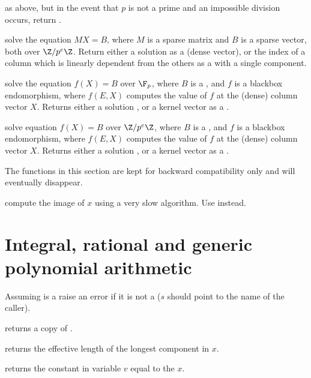as above, but in the event that $p$ is not a prime and an impossible division
occurs, return .

solve the equation $MX = B$, where $M$ is a sparse matrix and $B$ is a sparse
vector, both over $\Z/p^e\Z$. Return either a solution as a  (dense
vector), or the index of a column which is linearly dependent from the
others as a  with a single component.

solve the equation $f(X) = B$ over $\F_p$, where $B$ is a , and $f$
is a blackbox endomorphism, where $f(E, X)$ computes the value of $f$ at the
(dense) column vector $X$. Returns either a solution , or a kernel
vector as a .

solve equation $f(X) = B$ over $\Z/p^e\Z$, where $B$ is a , and $f$ is a
blackbox endomorphism, where $f(E, X)$ computes the value of $f$ at the
(dense) column vector $X$. Returns either a solution , or a kernel
vector as a .


The functions in this section are kept for backward compatibility only
and will eventually disappear.

 compute the image of $x$ using a very slow
algorithm. Use  instead.

\section{Integral, rational and generic polynomial arithmetic}


 Assuming  is a 
raise an error if it is not a  ($s$ should point to the name of the
caller).

 returns a copy of .

 returns the effective length of the longest
component in $x$.

 returns the constant  in variable
$v$ equal to the  $x$.


